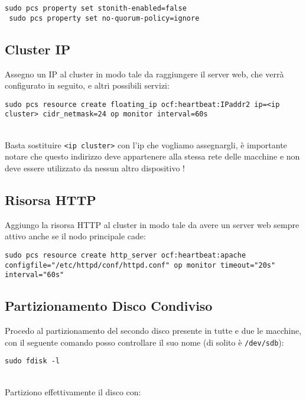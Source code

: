 \begin{lstlisting}[style=cmd]
 sudo pcs property set stonith-enabled=false
 sudo pcs property set no-quorum-policy=ignore
\end{lstlisting}

\subsection{Cluster IP}

Assegno un IP al cluster in modo tale da raggiungere il server web, che verr\`{a} configurato in seguito, e altri possibili servizi:

\begin{lstlisting}[style=cmd]
 sudo pcs resource create floating_ip ocf:heartbeat:IPaddr2 ip=<ip cluster> cidr_netmask=24 op monitor interval=60s
\end{lstlisting}
\ \\
Basta sostituire \lstinline[style=cmd]|<ip cluster>| con l'ip che vogliamo assegnargli, \`{e} importante notare che questo indirizzo deve appartenere alla stessa rete delle macchine e non deve essere utilizzato da nessun altro dispositivo !

\subsection{Risorsa HTTP}

Aggiungo la risorsa HTTP al cluster in modo tale da avere un server web sempre attivo anche se il nodo principale cade:

\begin{lstlisting}[style=cmd]
 sudo pcs resource create http_server ocf:heartbeat:apache configfile="/etc/httpd/conf/httpd.conf" op monitor timeout="20s" interval="60s"
\end{lstlisting}

\subsection{Partizionamento Disco Condiviso}

Procedo al partizionamento del secondo disco presente in tutte e due le macchine, con il seguente comando posso controllare il suo nome (di solito \`{e} \lstinline[style=cmd]|/dev/sdb|):

\begin{lstlisting}[style=cmd]
 sudo fdisk -l
\end{lstlisting}
\ \\
Partiziono effettivamente il disco con:

